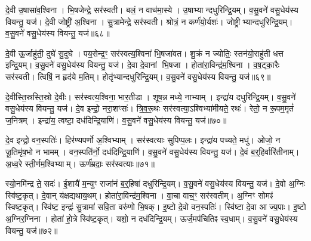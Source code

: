 दे॒वी उ॒षासा॑व॒श्विना।
भि॒षजेन्द्रे॒ सर॑स्वती।
बलं॒ न वाच॑मा॒स्ये।
उ॒षाभ्यान्दधुरिन्द्रि॒यम्।
व॒सु॒वने॑ वसु॒धेय॑स्य वियन्तु॒ यज॑।
दे॒वी जोष्ट्री॑ अ॒श्विना।
सु॒त्रामेन्द्रे॒ सर॑स्वती।
श्रोत्रं॒ न कर्ण॑यो॒र्यशः॑।
जोष्ट्रीभ्यान्दधुरिन्द्रि॒यम्।
व॒सु॒वने॑ वसु॒धेय॑स्य वियन्तु॒ यज॑॥६८॥

दे॒वी ऊ॒र्जाहु॑ती॒ दुघे॑ सु॒दुघे।
पय॒सेन्द्र॒ꣳ॒ सर॑स्वत्य॒श्विना॑ भि॒षजा॑वत।
शु॒क्रं न ज्योतिः॒ स्तन॑यो॒राहु॑ती धत्त इन्द्रि॒यम्।
व॒सु॒वने॑ वसु॒धेय॑स्य वियन्तु॒ यज॑।
दे॒वा दे॒वानां भि॒षजा।
होता॑रा॒विन्द्र॑म॒श्विना।
व॒ष॒ट्का॒रैः सर॑स्वती।
त्विषिं॒ न हृद॑ये म॒तिम्।
होतृ॑भ्यान्दधुरिन्द्रि॒यम्।
व॒सु॒वने॑ वसु॒धेय॑स्य वियन्तु॒ यज॑॥६९॥

दे॒वीस्ति॒स्रस्ति॒स्रो दे॒वीः।
सर॑स्वत्य॒श्विना॒ भार॒तीडा।
शूष॒न्न मध्ये॒ नाभ्याम्।
इन्द्रा॑य दधुरिन्द्रि॒यम्।
व॒सु॒वने॑ वसु॒धेय॑स्य वियन्तु॒ यज॑।
दे॒व इन्द्रो॒ नरा॒शꣳसः॑।
त्रि॒व॒रू॒थः सर॑स्वत्या॒\-ऽश्विभ्या॑मीयते॒ रथः॑।
रेतो॒ न रू॒पम॒मृतं॑ ज॒नित्रम्।
इन्द्रा॑य॒ त्वष्टा॒ दध॑दिन्द्रि॒याणि॑।
व॒सु॒वने॑ वसु॒धेय॑स्य वियन्तु॒ यज॑॥७०॥

दे॒व इन्द्रो॒ वन॒स्पतिः॑।
हिर॑ण्यपर्णो अ॒श्विभ्याम्।
सर॑स्वत्याः सुपिप्प॒लः।
इन्द्रा॑य पच्यते॒ मधु॑।
ओजो॒ न जू॒तिमृ॑ष॒भो न भामम्।
वन॒स्पति॑र्नो॒ दध॑दिन्द्रि॒याणि॑।
व॒सु॒वने॑ वसु॒धेय॑स्य वियन्तु॒ यज॑।
दे॒वं ब॒र्॒हिर्वारि॑तीनाम्।
अ॒ध्व॒रे स्ती॒र्णम॒श्विभ्याम्।
ऊर्ण॑म्रदाः॒ सर॑स्वत्याः॥७१॥

स्यो॒नमि॑न्द्र ते॒ सदः॑।
ई॒शायै॑ म॒न्युꣳ राजा॑नं ब॒र्॒हिषा॑ दधुरिन्द्रि॒यम्।
व॒सु॒वने॑ वसु॒धेय॑स्य वियन्तु॒ यज॑।
दे॒वो अ॒ग्निः स्वि॑ष्ट॒कृत्।
दे॒वान् य॑क्षद्यथाय॒थम्।
होता॑रा॒विन्द्र॑म॒श्विना।
वा॒चा वाच॒ꣳ॒ सर॑स्वतीम्।
अ॒ग्निꣳ सोमꣴ॑ स्विष्ट॒कृत्।
स्वि॑ष्ट॒ इन्द्रः॑ सु॒त्रामा॑ सवि॒ता वरु॑णो भि॒षक्।
इ॒ष्टो दे॒वो वन॒स्पतिः॑।
स्वि॑ष्टा दे॒वा आज्य॒पाः।
इ॒ष्टो अ॒ग्निर॒ग्निना।
होता॑ हो॒त्रे स्वि॑ष्ट॒कृत्।
यशो॒ न दध॑दिन्द्रि॒यम्।
ऊर्ज॒मप॑चितिꣴ स्व॒धाम्।
व॒सु॒वने॑ वसु॒धेय॑स्य वियन्तु॒ यज॑॥७२॥

